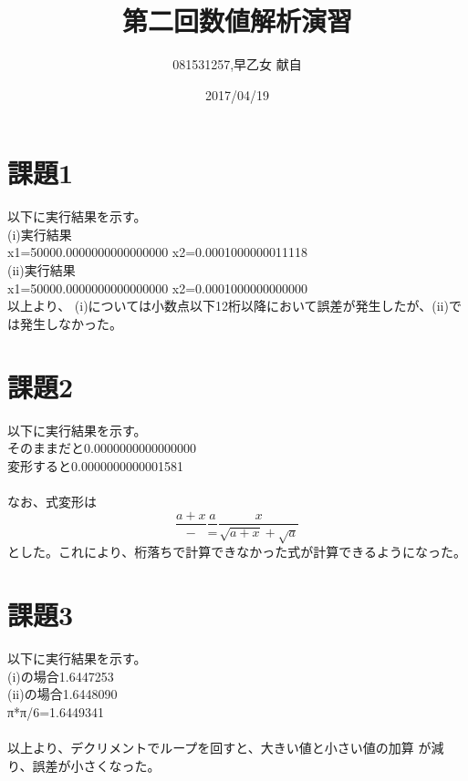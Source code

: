 \documentclass[]{jsarticle}
\title{第二回数値解析演習}
\author{081531257,早乙女 献自}
\date{2017/04/19}
\begin{document}
\maketitle
\section{課題1}
以下に実行結果を示す。\\
(i)実行結果\\
x1=50000.0000000000000000 x2=0.0001000000011118\\
(ii)実行結果\\
x1=50000.0000000000000000 x2=0.0001000000000000\\
以上より、 (i)については小数点以下12桁以降において誤差が発生したが、(ii)では発生しなかった。\\
\section{課題2}
以下に実行結果を示す。\\
そのままだと0.0000000000000000\\
変形すると0.0000000000001581\\\\
なお、式変形は\\
\begin{equation}
  \frac{a+x}-\frac{a}=\frac{x}{\sqrt{a+x}+\sqrt{a}}
\end{equation}
とした。これにより、桁落ちで計算できなかった式が計算できるようになった。\\
\section{課題3}
以下に実行結果を示す。\\
(i)の場合1.6447253\\
(ii)の場合1.6448090\\
π*π/6=1.6449341\\\\
以上より、デクリメントでループを回すと、大きい値と小さい値の加算
が減り、誤差が小さくなった。
\end{document}
